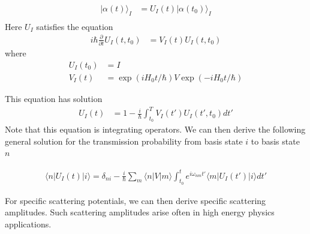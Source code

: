 \documentclass[book.tex]{subfiles}
\begin{document}
\begin{align}
    |\alpha(t)\rangle_I &= U_I(t)|\alpha(t_0) \rangle_I\\
\end{align}
Here $U_I$ satisfies the equation %
\begin{align}
    i\hbar\frac{\partial}{\partial t} U_I(t, t_0) &= V_I(t) U_I(t, t_0)
\end{align}
where
\begin{align}
    U_I(t_0) &= I \\
    V_I(t) &= \exp(iH_0t/\hbar)V\exp(-iH_0t/\hbar)
\end{align}

This equation has solution
\begin{align}
U_I(t) &= 1 - \frac{i}{\hbar}\int_{t_0}^T V_I(t')U_I(t', t_0)dt'
\end{align}
Note that this equation is integrating operators. %
We can then derive the following general solution for the transmission probability from basis state $i$ to basis state $n$%

\begin{align}
    \langle n | U_I(t)| i \rangle = \delta_{ni} - \frac{i}{\hbar}\sum_m \langle n|V|m \rangle \int_{t_0}^t e^{i\omega_{nm}t'} \langle m | U_I(t')|i \rangle dt'
\end{align}

For specific scattering potentials, we can then derive specific scattering amplitudes. Such scattering amplitudes arise often in high energy physics applications.
\end{document}
